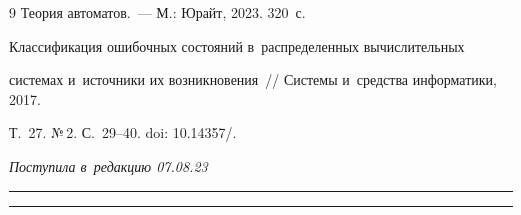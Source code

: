 {{\begin{thebibliography}{9}
 Тео\-рия автоматов.~--- М.: Юрайт, 2023. 320~с.




 Классификация ошибочных со\-сто\-яний в~распределенных вы\-чис\-ли\-тель\-ных  


сис\-те\-мах и~источники их возникновения~/\!\!/ Сис\-те\-мы и~средства информатики, 2017. 


Т.~27. №\,2. С.~29--40. doi: 10.14357\!/.





   \end{thebibliography}


} }











\vspace*{-6pt}





\hfill{\small\textit{Поступила в~редакцию 07.08.23}}





\vspace*{6pt}





\hrule





\vspace*{2pt}











\hrule





\vspace*{6pt}
















